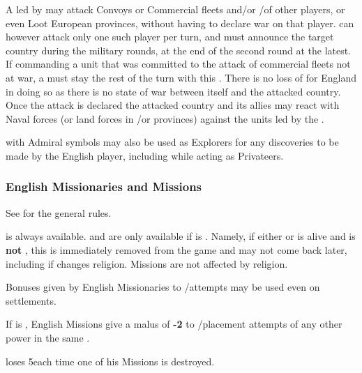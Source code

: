 \aparag[As Privateers]  A \corsaire led by  may
attack Convoys or Commercial fleets and/or \COL/\TP of other players,
or even Loot European provinces, without \ENG having to declare war
on that player.
\ENG can however attack only one such player per
turn, and must announce the target country during the military rounds,
at the end of the second round at the latest.
\bparag[Privateer] If commanding a \corsaire unit that was committed to
the attack of commercial fleets not at war, a  must
stay the rest of the turn with this \corsaire.
\bparag There is no loss of \STAB for England in doing so as there is no
state of war between itself and the attacked country.
\bparag Once the attack is declared the attacked country and its allies
may react with Naval forces (or land forces in \TP/\COL or provinces)
against the units led by the .

  with Admiral
symbols may also be used as Explorers for any discoveries to be made by
the English player, including while acting as Privateers.

\subsubsection{English Missionaries and Missions}
\aparag See  for the general rules.


\bparag {} is always available.  and
 are only available if \ANG is \PROTANG.
\bparag Namely, if either  or  is alive
and \ANG is \textbf{not} \PROTANG, this \LeaderMis is immediately
removed from the game and may not come back later, including if \ANG
changes religion.
\bparag Missions are not affected by religion.

\aparag Bonuses given by English Missionaries to \COL/\TP attempts may
be used even on \Faceplus settlements.

\aparag If \ANG is , English Missions give a malus
of {\bf -2} to \COL/\TP placement attempts of any other power in the
same \Area.

\aparag \ANG loses 5\PV each time one of his Missions is destroyed.

